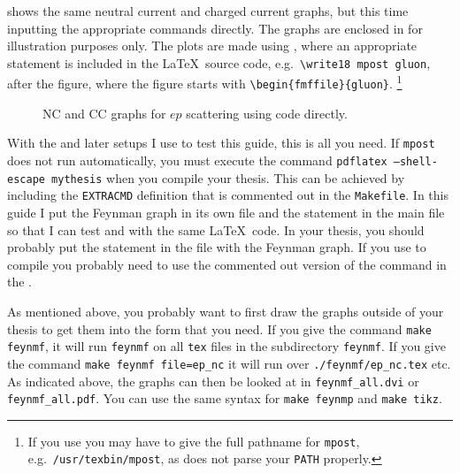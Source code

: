  shows the same neutral current and
charged current graphs, but this time inputting the appropriate
 commands directly. The graphs are enclosed in
 for illustration purposes only.
The plots are made using ,
where an appropriate
 statement is included in the \LaTeX\ source code,
e.g.\ \verb+\write18 mpost gluon+, after the figure, where the figure
starts with \verb+\begin{fmffile}{gluon}+.%
\footnote{If you use \TeXstudio you may have to give the full pathname for \texttt{mpost},
  e.g.\ \texttt{/usr/texbin/mpost}, as \TeXstudio does not parse your \texttt{PATH} properly.}

\begin{figure}[htbp]
  \centering
  \fbox{}
   {%
  }{
  }
  \qquad
  \fbox{}
   {%
  }{
  }
  \caption{NC and CC graphs for $ep$ scattering using 
    code directly.}%
  \label{fig:nccc-feynmf}
\end{figure}

With the  and later setups I use to test this guide,
this is all you need. If \texttt{mpost} does not run automatically,
you must execute the command
\texttt{pdflatex --shell-escape mythesis} when you compile your thesis.
This can be achieved by
including the \texttt{EXTRACMD} definition that is commented out in
the \texttt{Makefile}.
In this guide I put the Feynman graph in its
own file and the  statement in the main file so that
I can test  and  with the same
\LaTeX\ code. In your thesis, you should probably put the
 statement in the file with the Feynman graph.
If you use  to compile you probably need to use 
the commented out version of the  command in the .

As mentioned above, you probably want to first draw the graphs outside
of your thesis to get them into the form that you need. If you give
the command \texttt{make feynmf}, it will run \texttt{feynmf} on all
\texttt{tex} files in the subdirectory \texttt{feynmf}. If you give
the command \texttt{make feynmf file=ep\_nc} it will run over
\texttt{./feynmf/ep\_nc.tex} etc. As indicated above, the graphs can
then be looked at in \texttt{feynmf\_all.dvi} or\\
\texttt{feynmf\_all.pdf}. You can use the same syntax for
\texttt{make feynmp} and \texttt{make tikz}.


